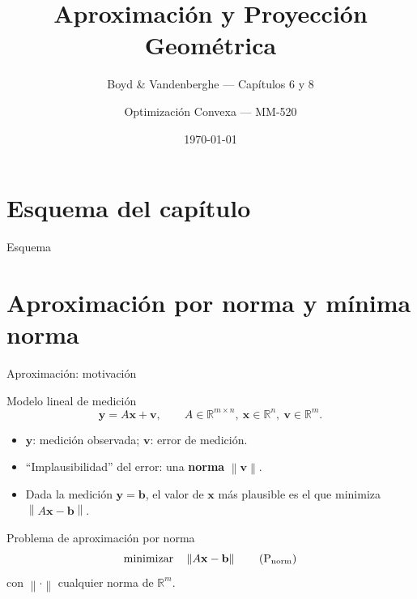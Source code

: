 \documentclass[10pt,aspectratio=169]{beamer}
\title{Aproximación y Proyección Geométrica}
\subtitle{Boyd \& Vandenberghe --- Capítulos 6 y 8}
\author{Optimización Convexa --- MM-520}
\date{\today}
\newcommand{\R}{\mathbb{R}}
\newcommand{\x}{\mathbf{x}}
\newcommand{\y}{\mathbf{y}}
\newcommand{\xv}{\mathbf{v}}
\newcommand{\xb}{\mathbf{b}}
\newcommand{\0}{\mathbf{0}}
\newcommand{\1}{\mathbf{1}}
\newcommand{\norm}[1]{\left\|#1\right\|}
\begin{document}
\begin{frame}
  \titlepage
\end{frame}

\section{Esquema del capítulo}
\begin{frame}{Esquema}
  \tableofcontents
\end{frame}

\section{Aproximación por norma y mínima norma}
\begin{frame}{Aproximación: motivación}
  \begin{block}{Modelo lineal de medición}
    \[
      \y = A\x + \xv, \qquad A\in\R^{m\times n},\ \x\in\R^n,\ \xv\in\R^m.
    \]
  \end{block}
  \begin{itemize}
    \item $\y$: medición observada; $\xv$: error de medición.
    \item ``Implausibilidad'' del error: una \textbf{norma} $\norm{\xv}$.
    \item Dada la medición $\y=\xb$, el valor de $\x$ más plausible es
          el que minimiza $\norm{A\x-\xb}$.
  \end{itemize}
  \vspace{0.3em}
  \begin{alertblock}{Problema de aproximación por norma}
    \begin{equation*}
      \text{minimizar}\quad \norm{A\x-\xb}
      \tag{P$_{\text{norm}}$}
    \end{equation*}
    con $\norm{\cdot}$ cualquier norma de $\R^m$.
  \end{alertblock}
\end{frame}
\end{document}
